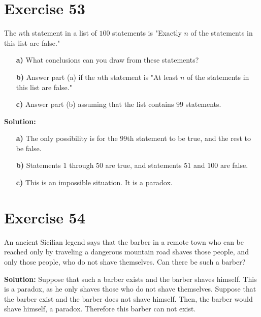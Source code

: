 \documentclass{Axon}
\begin{document}
\section*{Exercise 53}
The \(n\)th statement in a list of \(100\) statements is "Exactly \(n\) of the statements in this list are false."
\begin{enumerate}
    \item[\textbf{a)}] What conclusions can you draw from these statements?
    \item[\textbf{b)}] Answer part (a) if the \(n\)th statement is "At least \(n\) of the statements in this list are false."
    \item[\textbf{c)}] Answer part (b) assuming that the list contains \(99\) statements.
\end{enumerate}

\noindent
\textbf{Solution:}
\begin{itemize}
    \item[\textbf{a)}] The only possibility is for the \(99\)th statement to be true, and the rest to be false.
    \item[\textbf{b)}] Statements \(1\) through \(50\) are true, and statements \(51\) and \(100\) are false.
    \item[\textbf{c)}] This is an impossible situation. It is a paradox.
\end{itemize}

\section*{Exercise 54}
An ancient Sicilian legend says that the barber in a remote town who can be reached only by traveling a dangerous mountain road shaves those people, and only those people, who do not shave themselves. Can there be such a barber?

\noindent
\textbf{Solution:}
Suppose that such a barber exists and the barber shaves himself. This is a paradox, as he only shaves those who do not shave themselves. Suppose that the barber exist and the barber does not shave himself. Then, the barber would shave himself, a paradox. Therefore this barber can not exist.

\printbibliography
\end{document}
